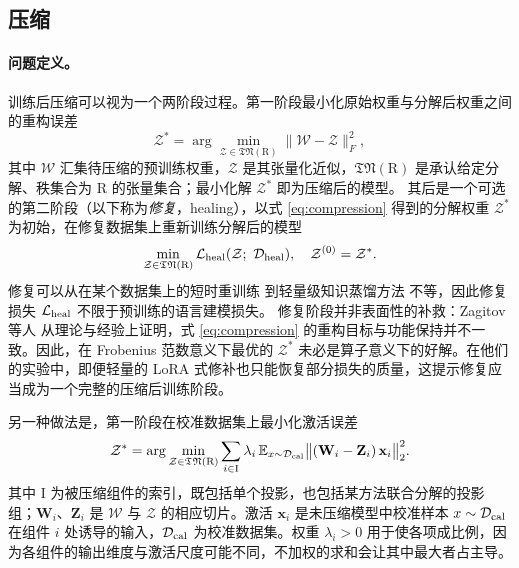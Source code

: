 \documentclass[11pt]{article}
\newcommand{\ten}[1]{\mathcal{#1}}
\newcommand{\mat}[1]{\mathbf{#1}}
\newcommand{\vecb}[1]{\mathbf{#1}}
\newcommand{\set}[1]{\mathrm{#1}}
\begin{document}
\subsection{压缩}
\label{subsec:compression}

\paragraph{问题定义。}

训练后压缩可以视为一个两阶段过程。第一阶段最小化原始权重与分解后权重之间的重构误差
\begin{equation}
\label{eq:compression}
\ten{Z}^* =\arg\min_{\ten{Z}\in\mathfrak{TN}(\set{R})}\|\ten{W}-\ten{Z}\|_F^2,
\end{equation}
其中 $\ten{W}$ 汇集待压缩的预训练权重，$\ten{Z}$ 是其张量化近似，$\mathfrak{TN}(\set{R})$ 是承认给定分解、秩集合为 $\set{R}$ 的张量集合；最小化解 $\ten{Z}^*$ 即为压缩后的模型。
其后是一个可选的第二阶段（以下称为\emph{修复}，healing），以式 \eqref{eq:compression} 得到的分解权重 $\ten{Z}^*$ 为初始，在修复数据集上重新训练分解后的模型
\begin{equation}
\label{eq:healing}
\min_{\ten{Z} \in \mathfrak{TN}(\set{R})} \mathcal{L}_{\rm heal}(\ten{Z}; \ \mathcal{D}_{\rm heal}), \quad \ten{Z}^{(0)} = \ten{Z}^*.
\end{equation}
修复可以从在某个数据集上的短时重训练 \cite{compactifai} 到轻量级知识蒸馏方法 \cite{tahaei2021kroneckerbert} 不等，因此修复损失 $\mathcal{L}_{\rm heal}$ 不限于预训练的语言建模损失。
修复阶段并非表面性的补救：Zagitov 等人 \cite{zagitov2026rethinking} 从理论与经验上证明，式 \eqref{eq:compression} 的重构目标与功能保持并不一致。因此，在 Frobenius 范数意义下最优的 $\ten{Z}^*$ 未必是算子意义下的好解。在他们的实验中，即便轻量的 LoRA 式修补也只能恢复部分损失的质量，这提示修复应当成为一个完整的压缩后训练阶段。
    

另一种做法是，第一阶段在校准数据集上最小化激活误差 \cite{koikeakino2025latentllm}
\begin{equation}
\label{eq:compression-activation}
\ten{Z}^* = \arg\min_{\ten{Z} \in \mathfrak{TN}(\set{R})}
  \sum_{i \in \set{I}} \lambda_i \,
  \mathbb{E}_{x \sim \mathcal{D}_{\rm cal}}
  \bigl\| (\mat{W}_i - \mat{Z}_i)\, \vecb{x}_i \bigr\|_2^2 .
\end{equation}
其中 $\set{I}$ 为被压缩组件的索引，既包括单个投影，也包括某方法联合分解的投影组；$\mat{W}_i$、$\mat{Z}_i$ 是 $\ten{W}$ 与 $\ten{Z}$ 的相应切片。激活 $\vecb{x}_i$ 是未压缩模型中校准样本 $x \sim \mathcal{D}_{\rm cal}$ 在组件 $i$ 处诱导的输入，$\mathcal{D}_{\rm cal}$ 为校准数据集。权重 $\lambda_i > 0$ 用于使各项成比例，因为各组件的输出维度与激活尺度可能不同，不加权的求和会让其中最大者占主导。
\end{document}
